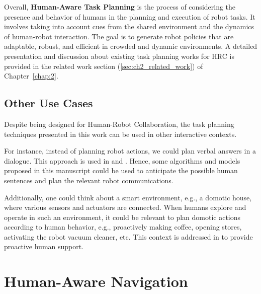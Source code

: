 Overall, \textbf{Human-Aware Task Planning} is the process of considering the presence and behavior of humans in the planning and execution of robot tasks. It involves taking into account cues from the shared environment and the dynamics of human-robot interaction. The goal is to generate robot policies that are adaptable, robust, and efficient in crowded and dynamic environments. A detailed presentation and discussion about existing task planning works for HRC is provided in the related work section (\ref{sec:ch2_related_work}) of Chapter~\ref{chap:2}.  


\subsection{Other Use Cases}

Despite being designed for Human-Robot Collaboration, the task planning techniques presented in this work can be used in other interactive contexts. 

For instance, instead of planning robot actions, we could plan verbal answers in a dialogue. 
This approach is used in \cite{de_carolis_verbal_2000} and \cite{de_carolis_behavior_2001}.
Hence, some algorithms and models proposed in this manuscript could be used to anticipate the possible human sentences and plan the relevant robot communications. 

Additionally, one could think about a smart environment, e.g., a domotic house, where various sensors and actuators are connected. When humans explore and operate in such an environment, it could be relevant to plan domotic actions according to human behavior, e.g., proactively making coffee, opening stores, activating the robot vacuum cleaner, etc. This context is addressed in \cite{pecora_constraint_based_2012} to provide proactive human support.


\section{Human-Aware Navigation}

